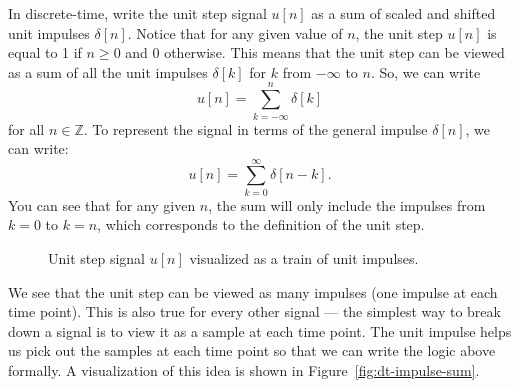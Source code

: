 \documentclass{ee102_notes}
\begin{document}
\begin{popquiz}
In discrete-time, write the unit step signal $u[n]$ as a sum of scaled and shifted unit impulses $\delta[n]$. 
\popqsplit
Notice that for any given value of $n$, the unit step $u[n]$ is equal to 1 if $n \geq 0$ and 0 otherwise. This means that the unit step can be viewed as a sum of all the unit impulses $\delta[k]$ for $k$ from $-\infty$ to $n$. So, we can write
\[
u[n] = \sum_{k=-\infty}^{n} \delta[k]
\]
for all $n \in \mathbb{Z}$. To represent the signal in terms of the general impulse $\delta[n]$, we can write:
\[
u[n] = \sum_{k=0}^{\infty} \delta[n-k].
\]
You can see that for any given $n$, the sum will only include the impulses from $k=0$ to $k=n$, which corresponds to the definition of the unit step. 
\end{popquiz}
\begin{figure}[h]
\centering
{}

\caption{Unit step signal $u[n]$ visualized as a train of unit impulses.}
\label{fig:d-t-unit-step}
\end{figure} 


We see that the unit step can be viewed as many impulses (one impulse at each time point). This is also true for every other signal --- the simplest way to break down a signal is to view it as a sample at each time point. The unit impulse helps us pick out the samples at each time point so that we can write the logic above formally. A visualization of this idea is shown in Figure~\ref{fig:dt-impulse-sum}. 
\end{document}

